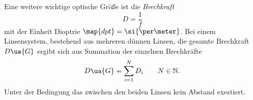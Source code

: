 Eine weitere wichtige optische Größe ist die \emph{Brechkraft}
\begin{equation}
  \label{eq: brechkraft}
  D=\frac{1}{f}
\end{equation}
mit der Einheit Dioptrie $\map{dpt}=\si{\per \meter}$.
Bei einem Linsensystem, bestehend aus mehreren dünnen Linsen, die gesamte %
Brechkraft $D\ua{G}$ ergibt sich aus Summation der einzelnen Brechkräfte %
\begin{equation*}
  D\ua{G}=\sum_{i=1}^{N}D_i \qquad N\in\mathbb{N}.
\end{equation*}
Unter der Bedingung das zwischen den beiden Linsen kein Abstand exestiert.
